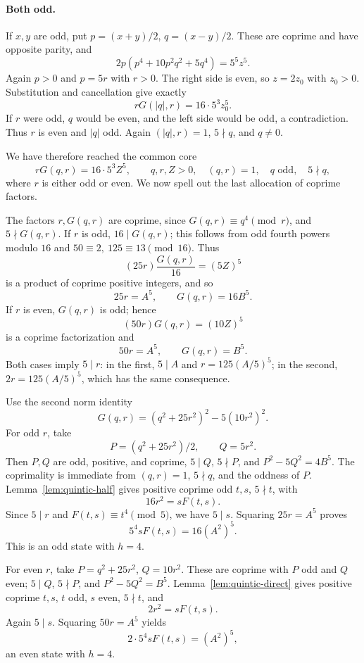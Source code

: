 \paragraph{Both odd.}
If \(x,y\) are odd, put
\(p=(x+y)/2\), \(q=(x-y)/2\).
These are coprime and have opposite parity, and
\[
 2p(p^4+10p^2q^2+5q^4)=5^5z^5.
\]
Again \(p>0\) and \(p=5r\) with \(r>0\).
The right side is even, so \(z=2z_0\) with \(z_0>0\).
Substitution and cancellation give exactly
\[
 rG(|q|,r)=16\cdot5^3z_0^5.
\]
If \(r\) were odd, \(q\) would be even, and the left side would be
odd, a contradiction.  Thus \(r\) is even and \(|q|\) odd.
Again \((|q|,r)=1\), \(5\nmid q\), and \(q\ne0\).

We have therefore reached the common core
\[
 rG(q,r)=16\cdot5^3Z^5,\qquad
 q,r,Z>0,\quad (q,r)=1,\quad q\text{ odd},\quad5\nmid q,
 \tag{Q18}\label{eq:quintic-unified-core}
\]
where \(r\) is either odd or even.
We now spell out the last allocation of coprime factors.

The factors \(r,G(q,r)\) are coprime, since
\(G(q,r)\equiv q^4\pmod r\), and \(5\nmid G(q,r)\).
If \(r\) is odd, \(16\mid G(q,r)\); this follows from
odd fourth powers modulo \(16\) and
\(50\equiv2,\ 125\equiv13\pmod {16}\).
Thus
\[
 (25r)\frac{G(q,r)}{16}=(5Z)^5
\]
is a product of coprime positive integers, and so
\[
 25r=A^5,\qquad G(q,r)=16B^5.
 \tag{Q19}\label{eq:quintic-initial-odd-split}
\]
If \(r\) is even, \(G(q,r)\) is odd; hence
\[
 (50r)G(q,r)=(10Z)^5
\]
is a coprime factorization and
\[
 50r=A^5,\qquad G(q,r)=B^5.
 \tag{Q20}\label{eq:quintic-initial-even-split}
\]
Both cases imply \(5\mid r\): in the first,
\(5\mid A\) and \(r=125(A/5)^5\); in the second,
\(2r=125(A/5)^5\), which has the same consequence.

Use the second norm identity
\[
 G(q,r)=(q^2+25r^2)^2-5(10r^2)^2.
 \tag{Q21}\label{eq:quintic-initial-norm}
\]
For odd \(r\), take
\[
 P=(q^2+25r^2)/2,\qquad Q=5r^2.
\]
Then \(P,Q\) are odd, positive, and coprime,
\(5\mid Q\), \(5\nmid P\), and
\(P^2-5Q^2=4B^5\).
The coprimality is immediate from \((q,r)=1\), \(5\nmid q\),
and the oddness of \(P\).
Lemma~\ref{lem:quintic-half} gives positive coprime odd \(t,s\),
\(5\nmid t\), with
\[
 16r^2=sF(t,s).
\]
Since \(5\mid r\) and \(F(t,s)\equiv t^4\pmod5\), we have \(5\mid s\).
Squaring \(25r=A^5\) proves
\[
 5^4sF(t,s)=16(A^2)^5.
\]
This is an odd state with \(h=4\).

For even \(r\), take
\(P=q^2+25r^2\), \(Q=10r^2\).
These are coprime with \(P\) odd and \(Q\) even;
\(5\mid Q\), \(5\nmid P\), and
\(P^2-5Q^2=B^5\).
Lemma~\ref{lem:quintic-direct} gives positive coprime \(t,s\),
\(t\) odd, \(s\) even, \(5\nmid t\), and
\[
 2r^2=sF(t,s).
\]
Again \(5\mid s\).  Squaring \(50r=A^5\) yields
\[
 2\cdot5^4sF(t,s)=(A^2)^5,
\]
an even state with \(h=4\).


